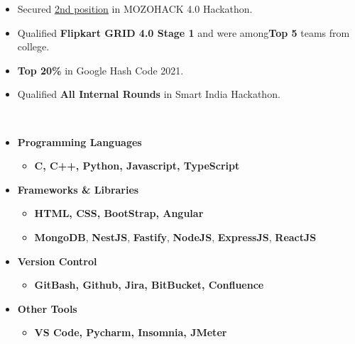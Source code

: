 \documentclass[10pt,a4paper,ragged2e]{altacv}
\begin{document}
\smallskip
\begin{itemize} 

\item Secured {\href{https://drive.google.com/file/d/1Bl6eUTNAeLVKgV4WQGnrAhG06EDJOI1n/view?usp=sharing}{2nd position}} in MOZOHACK 4.0 Hackathon.
\smallskip
\item Qualified \textbf{Flipkart GRID 4.0 Stage 1} and were among\textbf{Top 5} teams from college.
\smallskip
\item \textbf{Top 20\%} in Google Hash Code 2021. 
\item Qualified \textbf{All Internal Rounds} in Smart India Hackathon.\\
\end{itemize}
\\
\begin{itemize}
\item \large{\textbf{Programming Languages}}
  \begin{itemize}
  \smallskip
    \item \textbf{C, C++, Python, Javascript, TypeScript}
  \end{itemize}
  \smallskip
  \item \large{\textbf{Frameworks \& Libraries}} 
  \begin{itemize}
  \smallskip
  \smallskip
   \item \textbf{HTML, CSS, BootStrap, Angular}
\item \textbf{MongoDB},  \textbf{NestJS}, \textbf{Fastify}, \textbf{NodeJS}, \textbf{ExpressJS}, \textbf{ReactJS}

  \end{itemize}
  \smallskip
  \smallskip
  \item \large{\textbf{Version Control}}
  \begin{itemize}
  \smallskip
    \item \textbf{GitBash, Github, Jira, BitBucket, Confluence}
  \end{itemize}
   \smallskip
  \smallskip
  \item \large{\textbf{Other Tools}}
  \begin{itemize}
  \smallskip
    \item \textbf{VS Code, Pycharm, Insomnia, JMeter}  
  \end{itemize}
\end{itemize}
\end{document}
